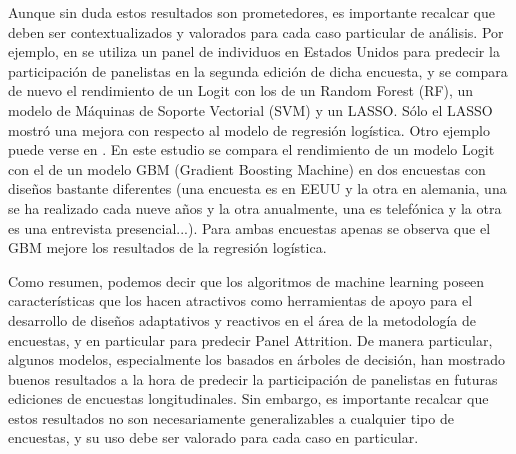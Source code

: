 Aunque sin duda estos resultados son prometedores, es importante recalcar que deben ser contextualizados y valorados para cada caso particular de análisis. Por ejemplo, en \cite{liu2020using} se utiliza un panel de individuos en Estados Unidos para predecir la participación de panelistas en la segunda edición de dicha encuesta, y se compara de nuevo el rendimiento de un Logit con los de un Random Forest (RF), un modelo de Máquinas de Soporte Vectorial (SVM) y un LASSO. Sólo el LASSO mostró una mejora con respecto al modelo de regresión logística. Otro ejemplo puede verse en \cite{jankowsky2022validation}. En este estudio se compara el rendimiento de un modelo Logit con el de un modelo GBM (Gradient Boosting Machine) en dos encuestas con diseños bastante diferentes (una encuesta es en EEUU y la otra en alemania, una se ha realizado cada nueve años y la otra anualmente, una es telefónica y la otra es una entrevista presencial...). Para ambas encuestas apenas se observa que el GBM mejore los resultados de la regresión logística.

Como resumen, podemos decir que los algoritmos de machine learning poseen características que los hacen atractivos como herramientas de apoyo para el desarrollo de diseños adaptativos y reactivos en el área de la metodología de encuestas, y en particular para predecir Panel Attrition. De manera particular, algunos modelos, especialmente los basados en árboles de decisión, han mostrado buenos resultados a la hora de predecir la participación de panelistas en futuras ediciones de encuestas longitudinales. Sin embargo, es importante recalcar que estos resultados no son necesariamente generalizables a cualquier tipo de encuestas, y su uso debe ser valorado para cada caso en particular.